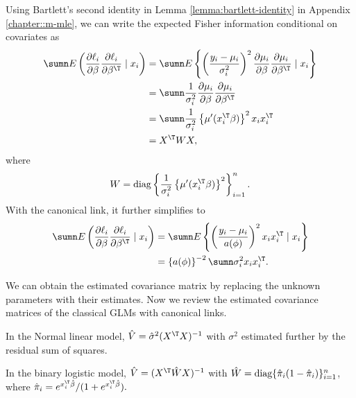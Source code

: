  
Using Bartlett's second identity in Lemma \ref{lemma:bartlett-identity} in Appendix \ref{chapter::m-mle},
we can write the expected Fisher information conditional on covariates
as
\begin{align*}
\sumn E\left(\frac{\partial\ell_{i}}{\partial\beta}\frac{\partial\ell_{i}}{\partial\beta^{\T}}\mid x_{i}\right) & =\sumn E\left\{ \left(\frac{y_{i}-\mu_{i}}{\sigma_{i}^{2}}\right)^{2}\frac{\partial\mu_{i}}{\partial\beta}\frac{\partial\mu_{i}}{\partial\beta^{\T}}\mid x_{i}\right\} \\
 & =\sumn\frac{1}{\sigma_{i}^{2}}\frac{\partial\mu_{i}}{\partial\beta}\frac{\partial\mu_{i}}{\partial\beta^{\T}}\\
 & =\sumn\frac{1}{\sigma_{i}^{2}}\left\{ \mu'(x_{i}^{\T}\beta)\right\} ^{2}x_{i}x_{i}^{\T}\\
 & =X^{\T}WX,
\end{align*}
where 
\[
W=\text{diag}\left\{ \frac{1}{\sigma_{i}^{2}}\left\{ \mu'(x_{i}^{\T}\beta)\right\} ^{2}\right\} _{i=1}^{n}.
\]
With the canonical link, it further simplifies to
\begin{align*}
\sumn E\left(\frac{\partial\ell_{i}}{\partial\beta}\frac{\partial\ell_{i}}{\partial\beta^{\T}}\mid x_{i}\right) & =\sumn E\left\{ \left(\frac{y_{i}-\mu_{i}}{a(\phi)}\right)^{2}x_{i}x_{i}^{\T}\mid x_{i}\right\} \\
 & =\left\{ a(\phi)\right\} ^{-2}\sumn\sigma_{i}^{2}x_{i}x_{i}^{\T} . 
\end{align*}

We can obtain the estimated covariance matrix by replacing the unknown parameters with their estimates. 
Now we review the estimated covariance matrices of the classical GLMs with canonical links. 
\setcounter{example}{0}
\begin{example}[continued]\label{eg::gaussianlinearmodel-continue1}
In the Normal linear model,  
$
\hat{V} =  \hat{\sigma}^2 (X^{\T} X)^{-1}
$
with $ \sigma^2$ estimated further by the residual sum of squares. 
\end{example}



\begin{example}[continued]\label{eg::binarylogisticmodel-continue1}
In the binary logistic model,  
$
\hat{V} = (X^{\T} \hat{W} X)^{-1}
$
with  $\hat{W}= \textup{diag}\{ \hat{\pi}_i (1-\hat{\pi}_i) \}_{i=1}^n $, where $ \hat{\pi}_i  = e^{x_i^{\T} \hat{\beta}} / (1+e^{x_i^{\T} \hat{\beta}}).$
\end{example}


